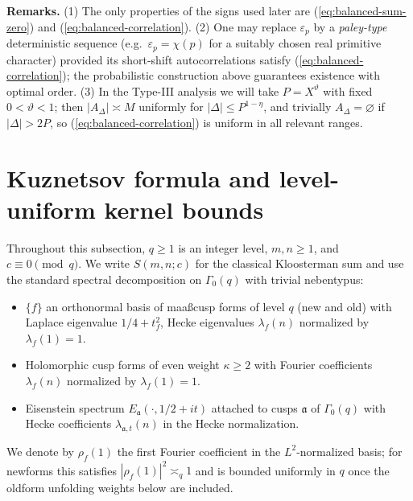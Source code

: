 \documentclass[11pt]{article}
\def\eqref#1{(\ref{#1})}%
\theoremstyle{definition}
\theoremstyle{remark}
\numberwithin{equation}{part}
\begin{document}
\noindent\textbf{Remarks.}
(1) The only properties of the signs used later are \eqref{eq:balanced-sum-zero} and \eqref{eq:balanced-correlation}.
(2) One may replace $\varepsilon_p$ by a \emph{paley-type} deterministic sequence (e.g.\ $\varepsilon_p=\chi(p)$ for a suitably chosen real primitive character) provided its short-shift autocorrelations satisfy \eqref{eq:balanced-correlation}; the probabilistic construction above guarantees existence with optimal order.
(3) In the Type-III analysis we will take $P=X^\vartheta$ with fixed $0<\vartheta<1$; then $|A_\Delta|\asymp M$ uniformly for $|\Delta|\le P^{1-\eta}$, and trivially $A_\Delta=\varnothing$ if $|\Delta|>2P$, so \eqref{eq:balanced-correlation} is uniform in all relevant ranges.


\bigskip

\section{Kuznetsov formula and level-uniform kernel bounds}\label{sec:kuznetsov-uniform}

Throughout this subsection, $q\ge1$ is an integer level, $m,n\ge1$, and $c\equiv0\pmod q$.
We write $S(m,n;c)$ for the classical Kloosterman sum and use the standard spectral decomposition on $\Gamma_0(q)$ with trivial nebentypus:
\begin{itemize}[leftmargin=2em]
	\item $\{f\}$ an orthonormal basis of maa\ss cusp forms of level $q$ (new and old) with Laplace eigenvalue $1/4+t_f^2$, Hecke eigenvalues $\lambda_f(n)$ normalized by $\lambda_f(1)=1$.
	\item Holomorphic cusp forms of even weight $\kappa\ge2$ with Fourier coefficients $\lambda_f(n)$ normalized by $\lambda_f(1)=1$.
	\item Eisenstein spectrum $E_\mathfrak a(\cdot,1/2+it)$ attached to cusps $\mathfrak a$ of $\Gamma_0(q)$ with Hecke coefficients $\lambda_{\mathfrak a, t}(n)$ in the Hecke normalization.
\end{itemize}
We denote by $\rho_f(1)$ the first Fourier coefficient in the $L^2$-normalized basis; for newforms this satisfies $|\rho_f(1)|^2\asymp_q 1$ and is bounded uniformly in $q$ once the oldform unfolding weights below are included.
\end{document}
